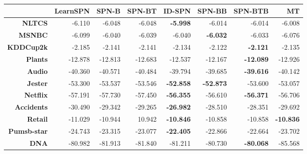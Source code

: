 \documentclass[final]{beamer}
\begin{document}
\begin{frame}{}
\begin{textblock}{25.2}
      \begin{table}[!htbp]
        \centering
        \scriptsize
        \setlength{\tabcolsep}{3pt}  
        \begin{tabular}{r r r r r r r r}
          \toprule
          & \textsf{LearnSPN} & \textsf{SPN-B} & \textsf{SPN-BT} & \textsf{ID-SPN}  & \textsf{SPN-BB}   & \textsf{SPN-BTB}  & \textsf{MT}      \\
          \midrule                                                                                     
          \textbf{NLTCS}      & -6.110            & -6.048         & -6.048          & \textbf{-5.998}  & -6.014            & -6.014            & -6.008           \\
          \textbf{MSNBC}      & -6.099            & -6.040         & -6.039          & -6.040           & \textbf{-6.032}   & -6.033            & -6.076           \\
          \textbf{KDDCup2k}   & -2.185            & -2.141         & -2.141          & -2.134           & -2.122            & \textbf{-2.121}   & -2.135           \\
          \textbf{Plants}     & -12.878           & -12.813        & -12.683         & -12.537          & -12.167           & \textbf{-12.089}  & -12.926          \\
          \textbf{Audio}      & -40.360           & -40.571        & -40.484         & -39.794          & -39.685           & \textbf{-39.616}  & -40.142          \\
          \textbf{Jester}     & -53.300           & -53.537        & -53.546         & \textbf{-52.858} & \textbf{-52.873}  & -53.600           & -53.057          \\
          \textbf{Netflix}    & -57.191           & -57.730        & -57.450         & \textbf{-56.355} & -56.610           & \textbf{-56.371}  & -56.706          \\
          \textbf{Accidents}  & -30.490           & -29.342        & -29.265         & \textbf{-26.982} & -28.510           & -28.351           & -29.692          \\
          \textbf{Retail}     & -11.029           & -10.944        & 10.942          & \textbf{-10.846} & -10.858           & -10.858           & \textbf{-10.836} \\
          \textbf{Pumsb-star} & -24.743           & -23.315        & -23.077         & \textbf{-22.405} & -22.866           & -22.664           & -23.702          \\
          \textbf{DNA}        & -80.982           & -81.913        & -81.840         & -81.211          & -80.730           & \textbf{-80.068}  & -85.568          \\

\end{tabular}
\end{table}
\end{textblock}
\end{frame}
\end{document}
